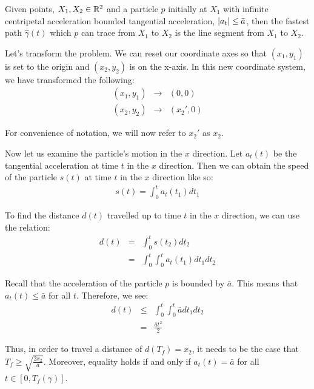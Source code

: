 
\begin{theorem}
  Given points, $X_1, X_2 \in \mathbb R^2$ and a particle $p$ initially at $X_1$ with infinite centripetal acceleration bounded tangential acceleration, $\abs{a_t} \le \bar{a}$, then the fastest path $\hat{\gamma}(t)$ which $p$ can trace from $X_1$ to $X_2$ is the line segment from $X_1$ to $X_2$.
\end{theorem}

\proof 

Let's transform the problem. We can reset our coordinate axes so that $(x_1, y_1)$ is set to the origin and $(x_2, y_2)$ is on the x-axis. In this new coordinate system, we have transformed the following:
\begin{eqnarray}
  (x_1, y_1) &\to& (0,0) \\
  (x_2, y_2) &\to& (x_2', 0)
\end{eqnarray}

For convenience of notation, we will now refer to $x_2'$ as $x_2$.

Now let us examine the particle's motion in the $x$ direction. Let $a_t(t)$ be the tangential acceleration at time $t$ in the $x$ direction. Then we can obtain the speed of the particle $s(t)$ at time $t$ in the $x$ direction like so:
\begin{eqnarray}
  s(t) = \int_0^t a_t(t_1) dt_1
\end{eqnarray}

To find the distance $d(t)$ travelled up to time $t$ in the $x$ direction, we can use the relation:
\begin{eqnarray}
  d(t) &=& \int_0^t s(t_2) dt_2 \\
       &=& \int_0^t \int_0^t a_t(t_1) dt_1 dt_2
\end{eqnarray}

Recall that the acceleration of the particle $p$ is bounded by $\bar{a}$. This means that $a_t(t) \leq \bar{a}$ for all $t$. Therefore, we see:
\begin{eqnarray}
  d(t) &\leq& \int_0^t \int_0^t \bar{a} dt_1 dt_2 \\
       &=& \frac{\bar{a} t^2}{2}
\end{eqnarray}

Thus, in order to travel a distance of $d(T_f) = x_2$, it needs to be the case that $T_f \geq \sqrt{\frac{2 x_2}{\bar{a}}}$. Moreover, equality holds if and only if $a_t(t) = \bar{a}$ for all $t \in [0, T_f(\gamma)]$.

